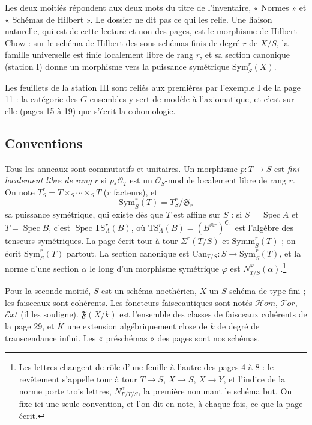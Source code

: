 \documentclass[11pt,a4paper]{article}
\begin{document}
Les deux moitiés répondent aux deux mots du titre de l'inventaire,
« Normes » et « Schémas de Hilbert ». Le dossier ne dit pas ce qui les
relie. Une liaison naturelle, qui est de cette lecture et non des pages, est
le morphisme de Hilbert--Chow : sur le schéma de Hilbert des sous-schémas
finis de degré $r$ de $X/S$, la famille universelle est finie localement
libre de rang $r$, et sa section canonique (station I) donne un morphisme
vers la puissance symétrique $\mathrm{Sym}^r_S(X)$.

Les feuillets de la station III sont reliés aux premières par l'exemple I
de la page 11 : la catégorie des $G$-ensembles y sert de modèle à
l'axiomatique, et c'est sur elle (pages 15 à 19) que s'écrit la
cohomologie.

\subsection*{Conventions}

Tous les anneaux sont commutatifs et unitaires. Un morphisme $p : T \to S$
est \emph{fini localement libre de rang $r$} si $p_{*}\mathcal{O}_T$ est un
$\mathcal{O}_S$-module localement libre de rang $r$. On note
$T^{r}_{S} = T \times_S \cdots \times_S T$ ($r$ facteurs), et
\[
  \mathrm{Sym}^{r}_{S}(T) = T^{r}_{S}/\mathfrak{S}_r
\]
sa puissance symétrique, qui existe dès que $T$ est affine sur $S$ : si
$S = \operatorname{Spec} A$ et $T = \operatorname{Spec} B$, c'est
$\operatorname{Spec} \mathrm{TS}^{r}_{A}(B)$, où
$\mathrm{TS}^{r}_{A}(B) = (B^{\otimes r})^{\mathfrak{S}_r}$ est l'algèbre des
tenseurs symétriques. La page écrit tour à tour $\Sigma^{r}(T/S)$ et
$\mathrm{Symm}^{r}_{S}(T)$ ; on écrit $\mathrm{Sym}^{r}_{S}(T)$ partout.
La section canonique est $\mathrm{Can}_{T/S} : S \to \mathrm{Sym}^{r}_{S}(T)$,
et la norme d'une section $\alpha$ le long d'un morphisme symétrique
$\varphi$ est $N^{\varphi}_{T/S}(\alpha)$.\footnote{Les lettres changent de
rôle d'une feuille à l'autre des pages 4 à 8 : le revêtement s'appelle tour à
tour $T \to S$, $X \to S$, $X \to Y$, et l'indice de la norme porte trois
lettres, $N^{\alpha}_{F/T/S}$, la première nommant le schéma but. On fixe ici
une seule convention, et l'on dit en note, à chaque fois, ce que la page
écrit.}

Pour la seconde moitié, $S$ est un schéma noethérien, $X$ un $S$-schéma de
type fini ; les faisceaux sont cohérents. Les foncteurs faisceautiques sont
notés $\mathcal{H}om$, $\mathcal{T}or$, $\mathcal{E}xt$ (il les souligne).
$\mathfrak{F}(X/k)$ est l'ensemble des classes de faisceaux cohérents de la
page 29, et $\widetilde{K}$ une extension algébriquement close de $k$ de
degré de transcendance infini. Les « préschémas » des pages sont nos schémas.
\end{document}
